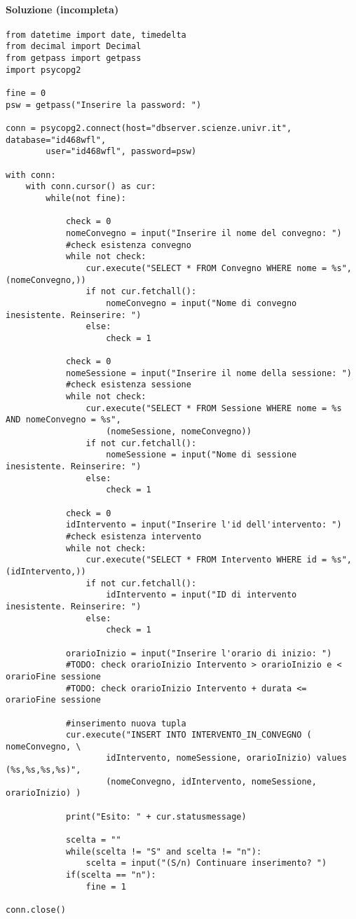 \documentclass[a4paper, 10pt, titlepage]{article}
\begin{document}
\paragraph{Soluzione (incompleta)}\dotfill
\lstset{language=Python}
\begin{footnotesize}
\begin{lstlisting}[tabsize=2]
from datetime import date, timedelta
from decimal import Decimal
from getpass import getpass
import psycopg2

fine = 0
psw = getpass("Inserire la password: ")

conn = psycopg2.connect(host="dbserver.scienze.univr.it", database="id468wfl", 
		user="id468wfl", password=psw)

with conn:
	with conn.cursor() as cur:
		while(not fine):

			check = 0
			nomeConvegno = input("Inserire il nome del convegno: ")
			#check esistenza convegno
			while not check:
				cur.execute("SELECT * FROM Convegno WHERE nome = %s", (nomeConvegno,))
				if not cur.fetchall():
					nomeConvegno = input("Nome di convegno inesistente. Reinserire: ")
				else:
					check = 1

			check = 0
			nomeSessione = input("Inserire il nome della sessione: ")
			#check esistenza sessione
			while not check:
				cur.execute("SELECT * FROM Sessione WHERE nome = %s AND nomeConvegno = %s",
					(nomeSessione, nomeConvegno))
				if not cur.fetchall():
					nomeSessione = input("Nome di sessione inesistente. Reinserire: ")
				else:
					check = 1

			check = 0
			idIntervento = input("Inserire l'id dell'intervento: ")
			#check esistenza intervento
			while not check:
				cur.execute("SELECT * FROM Intervento WHERE id = %s", (idIntervento,))
				if not cur.fetchall():
					idIntervento = input("ID di intervento inesistente. Reinserire: ")
				else:
					check = 1

			orarioInizio = input("Inserire l'orario di inizio: ")
			#TODO: check orarioInizio Intervento > orarioInizio e < orarioFine sessione
			#TODO: check orarioInizio Intervento + durata <= orarioFine sessione

			#inserimento nuova tupla
			cur.execute("INSERT INTO INTERVENTO_IN_CONVEGNO ( nomeConvegno, \
					idIntervento, nomeSessione, orarioInizio) values (%s,%s,%s,%s)", 
					(nomeConvegno, idIntervento, nomeSessione, orarioInizio) )
			
			print("Esito: " + cur.statusmessage)
			
			scelta = "" 
			while(scelta != "S" and scelta != "n"):
				scelta = input("(S/n) Continuare inserimento? ")
			if(scelta == "n"):
				fine = 1
				
conn.close()
\end{lstlisting}
\end{footnotesize}
\end{document}
